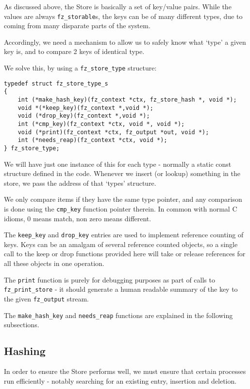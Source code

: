 \documentclass[oneside]{book}
\begin{document}
As discussed above, the Store is basically a set of key/value pairs. While the values are always \texttt{fz\_storable}s, the keys can be of many different types, due to coming from many disparate parts of the system.

Accordingly, we need a mechanism to allow us to safely know what `type' a given key is, and to compare 2 keys of identical type.

We solve this, by using a \texttt{fz\_store\_type} structure:

\begin{lstlisting}
typedef struct fz_store_type_s
{
	int (*make_hash_key)(fz_context *ctx, fz_store_hash *, void *);
	void *(*keep_key)(fz_context *,void *);
	void (*drop_key)(fz_context *,void *);
	int (*cmp_key)(fz_context *ctx, void *, void *);
	void (*print)(fz_context *ctx, fz_output *out, void *);
	int (*needs_reap)(fz_context *ctx, void *);
} fz_store_type;
\end{lstlisting}

We will have just one instance of this for each type - normally a static const structure defined in the code. Whenever we insert (or lookup) something in the store, we pass the address of that `types' structure.

We only compare items if they have the same type pointer, and any comparison is done using the \texttt{cmp\_key} function pointer therein. In common with normal C idioms, 0 means match, non zero means different.

The \texttt{keep\_key} and \texttt{drop\_key} entries are used to implement reference counting of keys. Keys can be an amalgam of several reference counted objects, so a single call to the keep or drop functions provided here will take or release references for all these objects in one operation.

The \texttt{print} function is purely for debugging purposes as part of calls to \texttt{fz\_print\_store} - it should generate a human readable summary of the key to the given \texttt{fz\_output} stream.

The \texttt{make\_hash\_key} and \texttt{needs\_reap} functions are explained in the following subsections.

\subsection{Hashing}

In order to ensure the Store performs well, we must ensure that certain processes run efficiently - notably searching for an existing entry, insertion and deletion.
\end{document}
